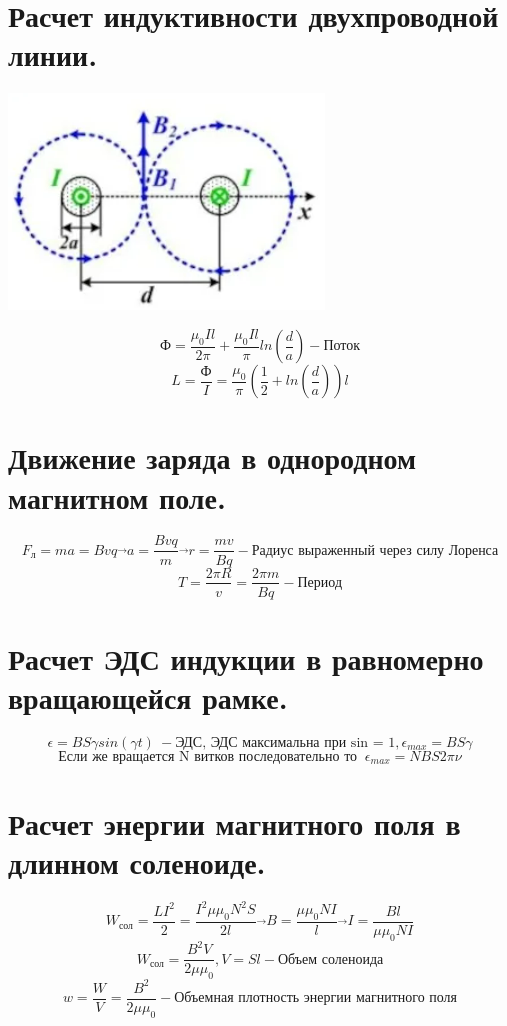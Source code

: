 \documentclass[12pt]{report}
\begin{document}
\section{Расчет индуктивности двухпроводной линии.}
\begin{center}
    \includegraphics[scale=0.9]{graphics/t27.png}
\end{center}
\[\text{Ф}=\frac{\mu_0 I l}{2\pi}+\frac{\mu_0 I l}{\pi} ln(\frac{d}{a}) - \text{Поток}\]
\[L=\frac{\text{Ф}}{I}=\frac{\mu_0}{\pi}(\frac{1}{2} + ln(\frac{d}{a}))l\]
\section{Движение заряда в однородном магнитном поле.}
\[F_л=ma=Bvq \overrightarrow{} a=\frac{Bvq}{m} \overrightarrow{} r=\frac{mv}{Bq}  - \text{Радиус выраженный через силу Лоренса}\]
\[T=\frac{2{\pi}R}{v}=\frac{2{\pi}m}{Bq} - \text{Период}\]
\section{Расчет ЭДС индукции в равномерно вращающейся рамке.}
\[\epsilon=BS\gamma sin(\gamma t)\ - \text{ЭДС, ЭДС максимальна при sin = 1},\epsilon_{max}=BS\gamma\]
\[\text{Если же вращается N витков последовательно то }\ \epsilon_{max}=NBS2\pi \nu\]
\section{Расчет энергии магнитного поля в длинном соленоиде.}
\[W_\text{сол}=\frac{L I^2}{2}=\frac{I^2 \mu \mu_0 N^2 S}{2l}  \overrightarrow{} B=\frac{\mu \mu_0 N I}{l} \overrightarrow{} I=\frac{B l}{\mu \mu_0 N I}\]
\[W_\text{сол}=\frac{B^2 V}{2\mu \mu_0}, V=Sl - \text{Объем соленоида}\]
\[w=\frac{W}{V}=\frac{B^2}{2 \mu \mu_0} - \text{Объемная плотность энергии магнитного поля}\]
\end{document}
